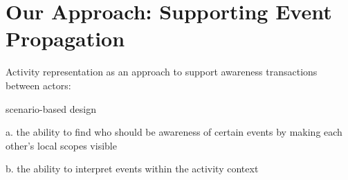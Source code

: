 \graphicspath{{Figures/}}

\chapter{Our Approach: Supporting Event Propagation} %
\label{cha:system_implementation}

Activity representation as an approach to support awareness transactions between actors:

scenario-based design

a. the ability to find who should be awareness of certain events by making each other's local scopes visible

b. the ability to interpret events within the activity context





 

